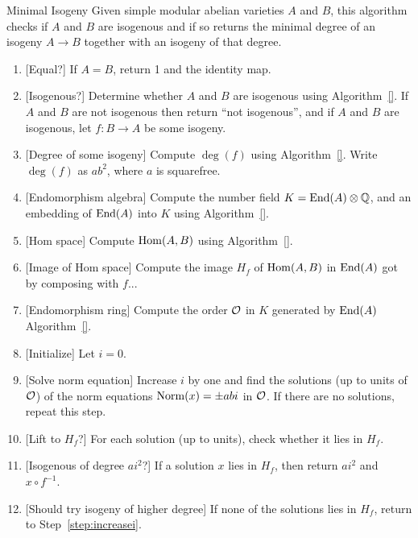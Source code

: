 \documentclass{article}
\begin{document}
\begin{algorithm}{Minimal Isogeny}
Given simple modular abelian varieties $A$ and $B$,
this algorithm checks if $A$ and $B$ are isogenous and if so returns the
minimal degree of an isogeny $A \to B$ together with an isogeny of
that degree.
\begin{enumerate}
\item{} [Equal?]  If $A=B$, return 1 and the identity map.
\item{} [Isogenous?]  Determine whether $A$ and $B$ are isogenous using Algorithm~\ref{}.
       If $A$ and $B$ are not isogenous then return ``not isogenous'', and if
       $A$ and $B$ are isogenous, let $f : B \to A$ be some isogeny.
\item{} [Degree of some isogeny] Compute $\deg(f)$ using Algorithm~\ref{}. Write $\deg(f)$ as $a b^2$, where
          $a$ is squarefree.
\item{} [Endomorphism algebra] Compute the number field $K=\operatorname{End}(A)\otimes\mathbb{Q}$, and
      an embedding of $\operatorname{End}(A)$ into $K$ using Algorithm~\ref{}.
\item{} [Hom space] Compute $\operatorname{Hom}(A,B)$ using Algorithm~\ref{}.
\item{} [Image of Hom space] Compute the image $H_f$ of $\operatorname{Hom}(A,B)$ in $\operatorname{End}(A)$
      got by composing with $f$...
\item{} [Endomorphism ring] Compute the order $\mathcal{O}$ in $K$ generated by $\operatorname{End}(A)$
Algorithm~\ref{}.
\item{} [Initialize] Let $i = 0$.
\item{} [Solve norm equation]\label{step:increasei} Increase $i$ by one and find the solutions (up to units of $\mathcal{O}$) of the norm equations
$\operatorname{Norm}(x) = \pm a b i$ in $\mathcal{O}$. If there are no solutions, repeat this step.
\item{} [Lift to $H_f$?] For each solution (up to units), check whether it lies in $H_f$.
\item{} [Isogenous of degree $ai^2$?] If a solution $x$ lies in $H_f$, then return $a  i^2$ and $x\circ f^{-1}$.
\item{} [Should try isogeny of higher degree] If none of the solutions lies in $H_f$, return
to Step~\ref{step:increasei}.
\end{enumerate}
\end{algorithm}
\end{document}
